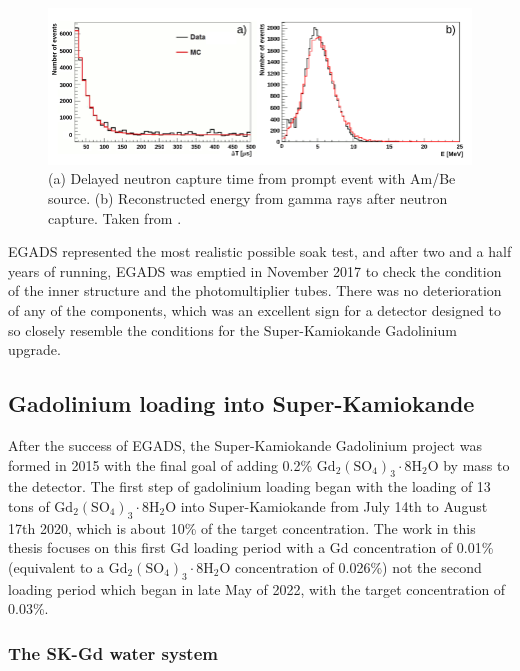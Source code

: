 \begin{figure}
    \includegraphics[width=\textwidth]{Figures/egads_ambe.png}
\caption{(a) Delayed neutron capture time from prompt event with Am/Be source. (b) Reconstructed energy from gamma rays after neutron capture. Taken from \cite{marti_evaluation_2020}.}
\label{fig:EGADS_ambe_capture}
\end{figure}


EGADS represented the most realistic possible soak test, and after two and a half years of running, EGADS was emptied in November 2017 to check the condition of the inner structure and the photomultiplier tubes. There was no deterioration of any of the components, which was an excellent sign for a detector designed to so closely resemble the conditions for the Super-Kamiokande Gadolinium upgrade. 

\subsection{Gadolinium loading into Super-Kamiokande}

After the success of EGADS, the Super-Kamiokande Gadolinium project was formed in 2015 with the final goal of adding 0.2\% $\mathrm{Gd}_{2}\left(\mathrm{SO}_{4}\right)_{3} \cdot 8 \mathrm{H}_{2} \mathrm{O}$ by mass to the detector. The first step of gadolinium loading began with the loading of 13 tons of $\mathrm{Gd}_{2}\left(\mathrm{SO}_{4}\right)_{3} \cdot 8 \mathrm{H}_{2} \mathrm{O}$ into Super-Kamiokande from July 14th to August 17th 2020, which is about 10\% of the target concentration. The work in this thesis focuses on this first Gd loading period with a Gd concentration of 0.01\% (equivalent to a $\mathrm{Gd}_{2}\left(\mathrm{SO}_{4}\right)_{3} \cdot 8 \mathrm{H}_{2} \mathrm{O}$ concentration of 0.026\%) not the second loading period which began in late May of 2022, with the target concentration of 0.03\%.

\subsubsection{The SK-Gd water system}

